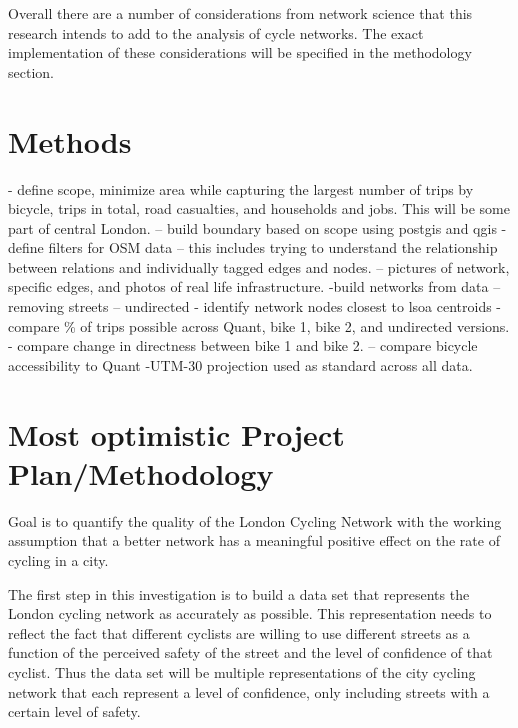 \documentclass[11pt]{article} %
\begin{document}
Overall there are a number of considerations from network science that this research intends to add to the analysis of cycle networks. The exact implementation of these considerations will be specified in the methodology section. 

\section{Methods}

- define scope, minimize area while capturing the largest number of trips by bicycle, trips in total, road casualties, and households and jobs. This will be some part of central London. 
-- build boundary based on scope using postgis and qgis
- define filters for OSM data
-- this includes trying to understand the relationship between relations and individually tagged edges and nodes. 
-- pictures of network, specific edges, and photos of real life infrastructure. 
-build networks from data
-- removing streets
-- undirected
- identify network nodes closest to lsoa centroids
-compare \% of trips possible across Quant, bike 1, bike 2, and undirected versions. 
- compare change in directness between bike 1 and bike 2.  
-- compare bicycle accessibility to Quant
-UTM-30 projection used as standard across all data. 


\section{Most optimistic Project Plan/Methodology}

Goal is to quantify the quality of the London Cycling Network with the working assumption that a better network has a meaningful positive effect on the rate of cycling in a city. 

The first step in this investigation is to build a data set that represents the London cycling network as accurately as possible. This representation needs to reflect the fact that different cyclists are willing to use different streets as a function of the perceived safety of the street and the level of confidence of that cyclist. Thus the data set will be multiple representations of the city cycling network that each represent a level of confidence, only including streets with a certain level of safety. 
\end{document}
